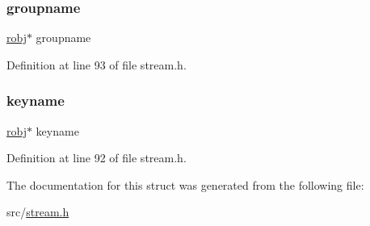 \subsubsection{\texorpdfstring{groupname}{groupname}}
{\footnotesize\ttfamily \hyperlink{server_8h_a540f174d2685422fbd7d12e3cd44c8e2}{robj}$\ast$ groupname}



Definition at line 93 of file stream.\+h.

\mbox{\label{structsream_prop_info_a37c11de77e5a9c1cbb2db7966f6c4ddd}} 
\subsubsection{\texorpdfstring{keyname}{keyname}}
{\footnotesize\ttfamily \hyperlink{server_8h_a540f174d2685422fbd7d12e3cd44c8e2}{robj}$\ast$ keyname}



Definition at line 92 of file stream.\+h.



The documentation for this struct was generated from the following file\+:\begin{DoxyCompactItemize}
\item 
src/\hyperlink{stream_8h}{stream.\+h}\end{DoxyCompactItemize}
